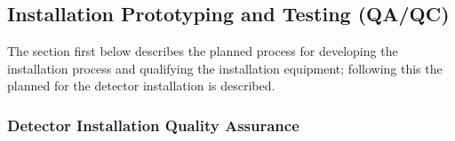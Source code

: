 



\subsection{Installation Prototyping and Testing (QA/QC)}
\label{sec:fdsp-tc-inst-qaqc}

The section first below describes the planned  process for developing the installation process and qualifying the installation equipment; following this the  planned for the detector installation is described.

\subsubsection{Detector Installation Quality Assurance}

